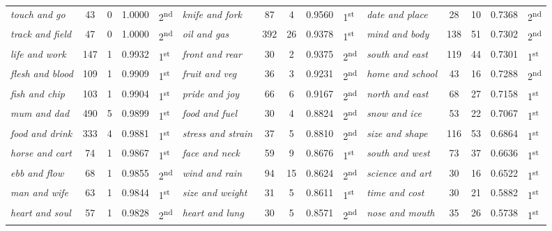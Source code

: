 \begin{table}
{\begin{tabular}[t]{l *{2}{S[table-format=3]} S[table-format=1.4] l  l *{2}{S[table-format=3]} S[table-format=1.4] l  l *{2}{S[table-format=3]} S[table-format=1.4] l}
\textit{touch and go} & 43 & 0 & 1.0000 & 2\textsuperscript{nd} & \textit{knife and fork} & 87 & 4 & 0.9560 & 1\textsuperscript{st} & \textit{date and place} & 28 & 10 & 0.7368 & 2\textsuperscript{nd} \\
\textit{track and field} & 47 & 0 & 1.0000 & 2\textsuperscript{nd} & \textit{oil and gas} & 392 & 26 & 0.9378 & 1\textsuperscript{st} & \textit{mind and body} & 138 & 51 & 0.7302 & 2\textsuperscript{nd} \\
\textit{life and work} & 147 & 1 & 0.9932 & 1\textsuperscript{st} & \textit{front and rear} & 30 & 2 & 0.9375 & 2\textsuperscript{nd} & \textit{south and east} & 119 & 44 & 0.7301 & 1\textsuperscript{st} \\
\textit{flesh and blood} & 109 & 1 & 0.9909 & 1\textsuperscript{st} & \textit{fruit and veg} & 36 & 3 & 0.9231 & 2\textsuperscript{nd} & \textit{home and school} & 43 & 16 & 0.7288 & 2\textsuperscript{nd} \\
\textit{fish and chip} & 103 & 1 & 0.9904 & 1\textsuperscript{st} & \textit{pride and joy} & 66 & 6 & 0.9167 & 2\textsuperscript{nd} & \textit{north and east} & 68 & 27 & 0.7158 & 1\textsuperscript{st} \\
\textit{mum and dad} & 490 & 5 & 0.9899 & 1\textsuperscript{st} & \textit{food and fuel} & 30 & 4 & 0.8824 & 2\textsuperscript{nd} & \textit{snow and ice} & 53 & 22 & 0.7067 & 1\textsuperscript{st} \\
\textit{food and drink} & 333 & 4 & 0.9881 & 1\textsuperscript{st} & \textit{stress and strain} & 37 & 5 & 0.8810 & 2\textsuperscript{nd} & \textit{size and shape} & 116 & 53 & 0.6864 & 1\textsuperscript{st} \\
\textit{horse and cart} & 74 & 1 & 0.9867 & 1\textsuperscript{st} & \textit{face and neck} & 59 & 9 & 0.8676 & 1\textsuperscript{st} & \textit{south and west} & 73 & 37 & 0.6636 & 1\textsuperscript{st} \\
\textit{ebb and flow} & 68 & 1 & 0.9855 & 2\textsuperscript{nd} & \textit{wind and rain} & 94 & 15 & 0.8624 & 2\textsuperscript{nd} & \textit{science and art} & 30 & 16 & 0.6522 & 1\textsuperscript{st} \\
\textit{man and wife} & 63 & 1 & 0.9844 & 1\textsuperscript{st} & \textit{size and weight} & 31 & 5 & 0.8611 & 1\textsuperscript{st} & \textit{time and cost} & 30 & 21 & 0.5882 & 1\textsuperscript{st} \\
\textit{heart and soul} & 57 & 1 & 0.9828 & 2\textsuperscript{nd} & \textit{heart and lung} & 30 & 5 & 0.8571 & 2\textsuperscript{nd} & \textit{nose and mouth} & 35 & 26 & 0.5738 & 1\textsuperscript{st} \\

\end{tabular}}
\end{table}
